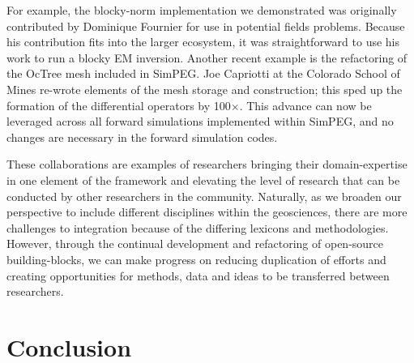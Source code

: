 \documentclass[paper]{geophysics}
\begin{document}
For example, the blocky-norm implementation we demonstrated was originally contributed by Dominique Fournier for use in potential fields problems. Because his contribution fits into the larger ecosystem, it was straightforward to use his work to run a blocky EM inversion. Another recent example is the refactoring of the OcTree mesh included in SimPEG. Joe Capriotti at the Colorado School of Mines re-wrote elements of the mesh storage and construction; this sped up the formation of the differential operators by 100$\times$. This advance can now be leveraged across all forward simulations implemented within SimPEG, and no changes are necessary in the forward simulation codes.

These collaborations are examples of researchers bringing their domain-expertise in one element of the framework and elevating the level of research that can be conducted by other researchers in the community. Naturally, as we broaden our perspective to include different disciplines within the geosciences,  there are more challenges to integration because of the differing lexicons and methodologies. However, through the continual development and refactoring of open-source building-blocks, we can make progress on reducing duplication of efforts and creating opportunities for methods, data and ideas to be transferred between researchers.



\section{Conclusion}
\end{document}
